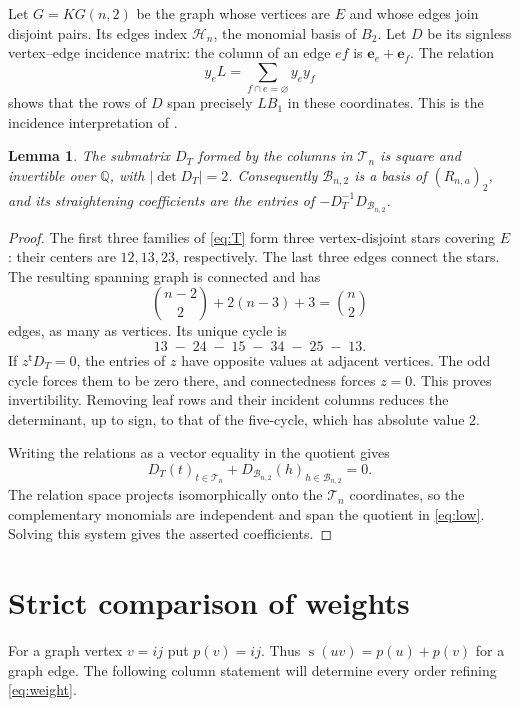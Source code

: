 \documentclass[11pt,a4paper]{article}
\newtheorem{lemma}[theorem]{Lemma}
\newcommand{\QQ}{\mathbb{Q}}
\newcommand{\HH}{\mathcal{H}_n}
\newcommand{\TT}{\mathcal{T}_n}
\newcommand{\BB}{\mathcal{B}_{n,2}}
\DeclareMathOperator{\score}{s}
\begin{document}
Let $G=KG(n,2)$ be the graph whose vertices are $E$ and whose edges join
disjoint pairs. Its edges index $\HH$, the monomial basis of $B_2$.
Let $D$ be its signless vertex--edge incidence matrix: the column of an
edge $ef$ is $\mathbf e_e+\mathbf e_f$. The relation
\[
 y_e L=\sum_{f\cap e=\varnothing}y_e y_f
\]
shows that the rows of $D$ span precisely $LB_1$ in these coordinates.
This is the incidence interpretation of \cite[Lemma 3.2]{DaoNair}.

\begin{lemma}\label{lem:incidence}
The submatrix $D_T$ formed by the columns in $\TT$ is square and
invertible over $\QQ$, with $|\det D_T|=2$. Consequently $\BB$ is a
basis of $(R_{n,a})_2$, and its straightening coefficients are the entries
of $-D_T^{-1}D_{\BB}$.
\end{lemma}

\begin{proof}
The first three families of \eqref{eq:T} form three vertex-disjoint
stars covering $E$: their centers are $12,13,23$, respectively.
The last three edges connect the stars. The resulting spanning graph
is connected and has
\[
 \binom{n-2}{2}+2(n-3)+3=\binom n2
\]
edges, as many as vertices. Its unique cycle is
\begin{equation}\label{eq:cycle}
 13\;-\;24\;-\;15\;-\;34\;-\;25\;-\;13.
\end{equation}
If $z^\mathsf{t}D_T=0$, the entries of $z$ have opposite values at
adjacent vertices. The odd cycle forces them to be zero there, and
connectedness forces $z=0$. This proves invertibility. Removing leaf
rows and their incident columns reduces the determinant, up to sign,
to that of the five-cycle, which has absolute value $2$.

Writing the relations as a vector equality in the quotient gives
\[
 D_T(t)_{t\in\TT}+D_{\BB}(h)_{h\in\BB}=0.
\]
The relation space projects isomorphically onto the $\TT$ coordinates,
so the complementary monomials are independent and span the quotient
in \eqref{eq:low}. Solving this system gives the asserted coefficients.
\end{proof}

\section{Strict comparison of weights}\label{sec:weights}

For a graph vertex $v=ij$ put $p(v)=ij$. Thus
$\score(uv)=p(u)+p(v)$ for a graph edge. The following column statement
will determine every order refining \eqref{eq:weight}.
\end{document}
